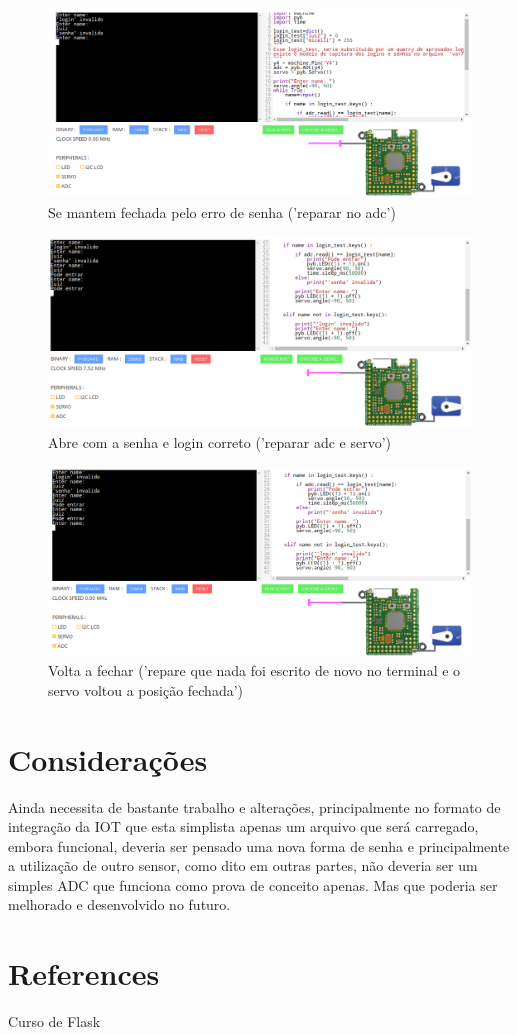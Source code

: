 \documentclass[12pt]{article}
\begin{document}
\begin{figure}[ht]
\centering
\includegraphics[width=.5\textwidth]{imagens/fechada2.png}
\caption{Se mantem fechada pelo erro de senha ('reparar no adc')}
\end{figure}

\begin{figure}[ht]
\centering
\includegraphics[width=.5\textwidth]{imagens/aberta.png}
\caption{Abre com a senha e login correto ('reparar adc e servo')}
\end{figure}

\begin{figure}[ht]
\centering
\includegraphics[width=.5\textwidth]{imagens/fechada3.png}
\caption{Volta a fechar ('repare que nada foi escrito de novo no terminal e o servo voltou a posição fechada')}
\end{figure}

\section{Considerações}
Ainda necessita de bastante trabalho e alterações, principalmente no formato de integração da IOT que esta simplista
apenas um arquivo que será carregado, embora funcional, deveria ser pensado uma nova forma de senha e principalmente a
utilização de outro sensor, como dito em outras partes, não deveria ser um simples ADC que funciona como prova de
conceito apenas. Mas que poderia ser melhorado e desenvolvido no futuro.


\section{References}

Curso de Flask


\end{document}
